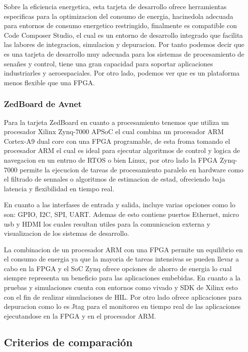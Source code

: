 Sobre la eficiencia energetica, esta tarjeta de desarrollo ofrece herramientas especificas para la optimizacion del consumo de energia, hacinedola adecuada para entornos de consumo energetico 
restringido, finalmente es compatible con Code Composer Studio, el cual es un entorno de desarrollo integrado que facilita las labores de integracion, simulacion y depuracion. Por tanto podemos
decir que es una tarjeta de desarrollo muy adecuada para los sistemas de procesamiento de senañes y control, tiene una gran capacidad para soportar aplicaciones industriarles y aeroespaciales. Por otro
lado, podemos ver que es un plataforma menos flexible que una FPGA. 

\subsubsection{ZedBoard de Avnet}

Para la tarjeta ZedBoard en cuanto a procesamiento tenemos que utiliza un procesador Xilinx Zynq-7000 APSoC el cual combina un procesador ARM Cortex-A9 dual core con una FPGA programable, de esta froma 
tomando el procesador ARM el cual es ideal para ejecutar algoritmos de control y  logica de navegacion en un entrno de RTOS o bien Linux, por otro lado la FPGA Zynq-7000 permite la ejecucion de tareas 
de procesamiento paralelo en hardware como el filtrado de sennales o algoritmos de estimacion de estad, ofreciendo baja latencia y flexibilidad en tiempo real.

En cuanto a las interfases de entrada y salida, incluye varias opciones como lo son: GPIO, I2C, SPI, UART. Ademas de esto contiene puertos Ethernet, micro usb y HDMI los cuales resultan utiles para la 
comunicacion externa y visualizacion de los sistemas de desarrollo.

La combinacion de un procesador ARM con una FPGA permite un equilibrio en el consumo de energia ya que la mayoria de tareas intensivas se pueden llevar a cabo en la FPGA y el SoC Zynq ofrece opciones de 
ahorro de energia lo cual siempre representa un beneficio para las aplicaciones embebidas. En cuanto a la pruebas y simulaciones cuenta con entornos como vivado y SDK de Xilinx esto con el fin de realizar
simulaciones de HIL. Por otro lado ofrece aplicaciones para depuracion como lo es Jtag para el monitoreo en tiempo real de las aplicaciones ejecutandose en la FPGA y en el procesador ARM.
\subsection{Criterios de comparación}

